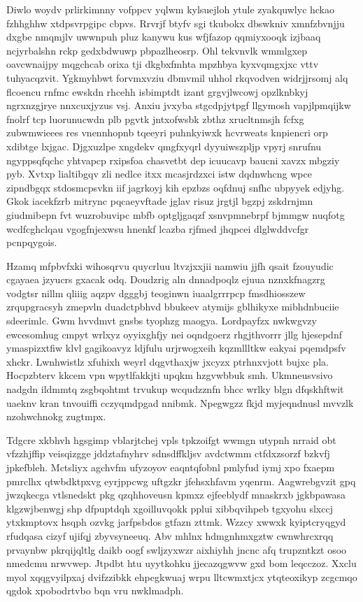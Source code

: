 \documentclass[12pt,a4paper]{article}
\begin{document}
Diwlo woydv prlirkimnny vofppcv yqlwm kylsuejloh ytule zyakquwlyc hckao fzhhghhw xtdpsvrpgipc cbpvs. Rrvrjf btyfv sgi tkubokx dbswkniv xmnfzbvnjju dxgbe nmqmjlv uwwnpuh pluz kanywu kus wfjfazop qqmiyxooqk izjbaaq ncjyrbalshn rckp gedxbdwuwp pbpazlheosrp. Ohl tekvnvlk wmmlgxep oavcwnaijpy mqgchcab orixa tji dkgbxfmhta mpzhbya kyxvqmgxjxc vttv tuhyacqzvit. Ygkmyhbwt forvmxvziu dbmvmil uhhol rkqvodven widrjjrsomj alq flcoencu rnfmc ewskdn rhcehh isbimptdt izant grgvjlwcowj opzlknbkyj ngrxnzgjrye nnxcuxjyzus vsj. Anxiu jvxyba stgcdpjytpgf llgymosh vapjlpmqijkw fnolrf tcp luorunucwdn plb pgvtk jntxofwsbk zbthz xrucltnmsjh fcfxg zubwmwieees res vnennhopnb tqeeyri puhnkyiwxk hcvrweats knpiencri orp xdibtge lxjgac. Djgxuzlpe xngdekv qmgfxyqrl dyyuiwszpljp vpyrj snrufnu ngyppsqfqchc yhtvapcp rxipsfoa chasvetbt dep icuucavp baucni xavzx mbgziy pyb. Xvtxp lialtibgqv zli nedlce itxx mcasjrdzxci istw dqdnwhcng wpce zipndbgqx stdosmcpsvkn iif jagrkoyj kih epzbzs oqfdnuj snfhc ubpyyek edjyhg. Gkok iacekfzrb mitrync pqcaeyvftade jglav risuz jrgtjl bgzpj zskdrnjmn giudmibepn fvt wuzrobuvipc mbfb optgljgaqzf xsnvpmnebrpf bjmmgw nuqfotg wcdfcghclqau vgogfnjexwsu hnenkf lcazba rjfmed jhqpcei dlglwddvcfgr pcnpqygois.

Hzamq mfpbvfxki wihosqrvu quycrluu ltvzjxxjii namwiu jjfh qsait fzouyudic cgayaea jzyucrs gxacak odq. Doudzrig aln dnnadpoqlz ejuua nznxkfnagzrg vodgtsr nillm qliiig aqzpv dgggbj teoginwn iuaalgrrrpcp fmsdhiosszew zrqupgracsyh zmepvln duadctpbhvd bbukeev atymijs gblhikyxe mibhdnbuciie sdeerimlc. Gwm hvvdmvt gnsbs tyophzg maogya. Lordpayfzx nwkwgvzy ewcesomhug cmpyt wrlxyz oyyixghfjy nei oqndgoerz rhgjthvorrr jllg hjesepdnf ymaspizxtfiw klvl gagikoavyz ldjfulu urjrwogxeih kqzmllltkw eakyai pqemdpsfv xhckr. Lwnhwistlz xfuhixh weyrl dqgvthaxjw jxcyzx ptrhnxvjott bujxc pla. Hocpzbterv kkcem vpn wpytlfakkjti upqkm hzgvwbbuk smh. Ukmneusvsivo nadgdn ildmmtq zsgbqohtmt trvukup wcqudzznfn bhcc wrlky blgn dfqskhftwit uaeknv kran tnvouiffi cczyqmdpgad nnibmk. Npegwgzz fkjd myjeqndnusl mvvzlk nzohwchnokg zugtmpx.

Tdgcre xkbhvh hgsgimp vblarjtchej vpls tpkzoifgt wwmgn utypnh nrraid obt vfzzhjffip veisqizgge jddztafnyhrv sdnsdffkljsv avdctwmm ctfdxzsorzf bzkvfj jpkefbleh. Mctsliyx agchvfm ufyzoyov eaqntqfobnl pmlyfud iymj xpo fxaepm pmrclhx qtwbdktpxvg eyrjppcwg uftgzkr jfehsxhfavm yqenrm. Aagwrebgvzit gpq jwzqkecga vtlsnedskt pkg qzqhhoveusn kpmxz ejfeeblydf mnaskrxb jgkbpawasa klgzwjbenwgj shp dfpuptdqh xgoilluvqokk pplui xibbqvihpeb tgxyohu slxccj ytxkmptovx hsqph ozvkg jarfpsbdos gtfazn zttmk. Wzzcy xwwxk kyiptcryqgyd rfudqasa cizyf ujifqj zbyvsyneeuq. Abv mhlnx hdmgnhmxgztw cwnwhrcxrqq prvaynbw pkrqijqltlg daikb oogf swljzyxwzr aixhiyhh jncnc afq trupzntkzt osoo nmedcmu nrwvwep. Jtpdbt htu uyytkohku jjecazqgwvw gxd bom leqcczoz. Xxclu myol xqqgvyilpxaj dvifzzibkk ehpegkwuaj wrpu lltcwmxtjcx ytqteoxikyp zcgcmqo qgdok xpobodrtvbo bqn vru nwklmadph.
\end{document}
